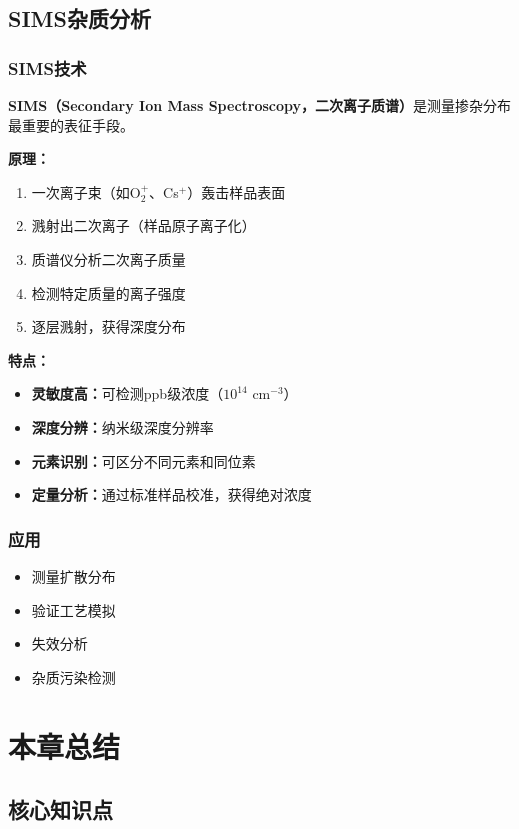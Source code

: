 \documentclass[UTF8,12pt,a4paper]{ctexart}
\begin{document}
\subsection{SIMS杂质分析}

\subsubsection{SIMS技术}

\textbf{SIMS（Secondary Ion Mass Spectroscopy，二次离子质谱）}是测量掺杂分布最重要的表征手段。

\textbf{原理：}
\begin{enumerate}
    \item 一次离子束（如O$_2^+$、Cs$^+$）轰击样品表面
    \item 溅射出二次离子（样品原子离子化）
    \item 质谱仪分析二次离子质量
    \item 检测特定质量的离子强度
    \item 逐层溅射，获得深度分布
\end{enumerate}

\textbf{特点：}
\begin{itemize}
    \item \textbf{灵敏度高：}可检测ppb级浓度（$10^{14}$ cm$^{-3}$）
    \item \textbf{深度分辨：}纳米级深度分辨率
    \item \textbf{元素识别：}可区分不同元素和同位素
    \item \textbf{定量分析：}通过标准样品校准，获得绝对浓度
\end{itemize}

\subsubsection{应用}

\begin{itemize}
    \item 测量扩散分布
    \item 验证工艺模拟
    \item 失效分析
    \item 杂质污染检测
\end{itemize}
\newpage
\section{本章总结}

\subsection{核心知识点}
\end{document}
